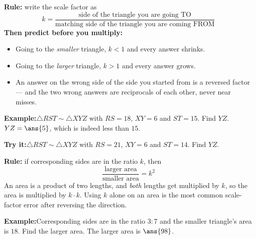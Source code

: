 \documentclass[12pt]{article}
\begin{document}
\begin{formulabox}
\textbf{Rule:} write the scale factor as
\[ k = \frac{\text{side of the triangle you are going TO}}
            {\text{matching side of the triangle you are coming FROM}} \]
\textbf{Then predict before you multiply:}
\begin{itemize}[leftmargin=0.8cm, itemsep=1pt, topsep=2pt]
  \item Going to the \emph{smaller} triangle, $k < 1$ and every answer shrinks.
  \item Going to the \emph{larger} triangle, $k > 1$ and every answer grows.
  \item An answer on the wrong side of the side you started from is a reversed
        factor --- and the two wrong answers are reciprocals of each other, never
        near misses.
\end{itemize}
\end{formulabox}

\begin{examplebox}
\textbf{Example:}\quad $\triangle RST \sim \triangle XYZ$ with $RS = 18$,
$XY = 6$ and $ST = 15$. Find $YZ$.
$YZ = \ans{5}$, which is indeed less than $15$.
\end{examplebox}

\begin{tryitbox}
\textbf{Try it:}\quad $\triangle RST \sim \triangle XYZ$ with $RS = 21$,
$XY = 6$ and $ST = 14$. Find $YZ$.\\[2pt]
\end{tryitbox}


\begin{formulabox}
\textbf{Rule:} if corresponding sides are in the ratio $k$, then
\[ \frac{\text{larger area}}{\text{smaller area}} = k^2 \]
An area is a product of two lengths, and \emph{both} lengths get multiplied by
$k$, so the area is multiplied by $k \cdot k$. Using $k$ alone on an area is the
most common scale-factor error after reversing the direction.
\end{formulabox}

\begin{examplebox}
\textbf{Example:}\quad Corresponding sides are in the ratio $3 : 7$ and the smaller
triangle's area is $18$. Find the larger area.
The larger area is $\ans{98}$.
\end{examplebox}
\end{document}
